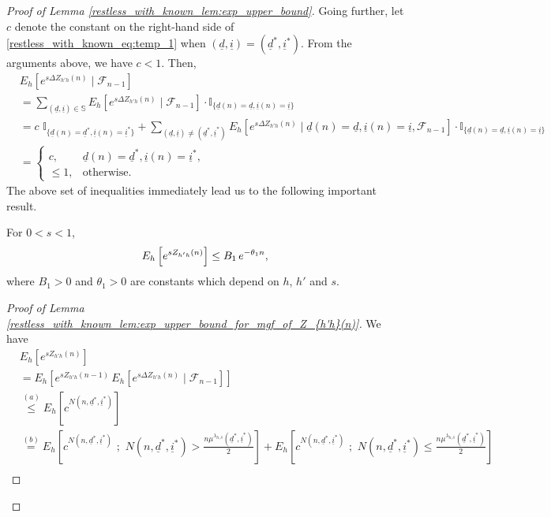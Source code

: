 \begin{proof}[Proof of Lemma \ref{restless_with_known_lem:exp_upper_bound}]
Going further, let $c$ denote the constant on the right-hand side of \eqref{restless_with_known_eq:temp_1} when $(\underline{d},\underline{i})=(\underline{d}^*,\underline{i}^*)$. From the arguments above, we have $c<1$. Then,
\begin{align}
	&E_h\left[e^{s\Delta Z_{h'h}(n)} \mid \mathcal{F}_{n-1}\right]\nonumber\\
	&=\sum\limits_{(\underline{d},\underline{i})\in\mathbb{S}}E_h\left[e^{s\Delta Z_{h'h}(n)} \mid \mathcal{F}_{n-1}\right]\cdot \mathbb{I}_{\{\underline{d}(n)=\underline{d},\underline{i}(n)=\underline{i}\}}\nonumber\\
	&=c\,\,\mathbb{I}_{\{\underline{d}(n)=\underline{d}^*,\underline{i}(n)=\underline{i}^*\}}+\sum\limits_{(\underline{d},\underline{i})\neq (\underline{d}^*,\underline{i}^*)}E_h\left[e^{s\Delta Z_{h'h}(n)} \mid \underline{d}(n)=\underline{d},\underline{i}(n)=\underline{i},\mathcal{F}_{n-1}\right]\cdot \mathbb{I}_{\{\underline{d}(n)=\underline{d},\underline{i}(n)=\underline{i}\}}\nonumber\\
	&=\begin{cases}
		c,&\underline{d}(n)=\underline{d}^*,\underline{i}(n)=\underline{i}^*,\\
		\leq 1,&\text{otherwise}.
	\end{cases}\label{restless_with_known_eq:temp_3}
\end{align}
The above set of inequalities immediately lead us to the following important result.
\begin{lemma}\label{restless_with_known_lem:exp_upper_bound_for_mgf_of_Z_{h'h}(n)}
	For $0<s<1$, 
	\begin{equation}
		E_h\left[e^{s Z_{h'h}(n)}\right]\leq B_1\,e^{-\theta_1 n},\label{restless_with_known_eq:exp_upper_bound_for_mgf_of_Z_{h'h}(n)}
	\end{equation}
	where $B_1>0$  and $\theta_1>0$ are constants which depend on $h$, $h'$ and $s$.
\end{lemma}
\begin{proof}[Proof of Lemma \ref{restless_with_known_lem:exp_upper_bound_for_mgf_of_Z_{h'h}(n)}]
We have
\begin{align}
	&E_h\left[e^{s Z_{h'h}(n)}\right]\nonumber\\
	&=E_h[e^{s Z_{h'h}(n-1)}\,E_h[e^{s \Delta Z_{h'h}(n)}\mid \mathcal{F}_{n-1}]]\nonumber\\
	&\stackrel{(a)}{\leq}E_h\left[c^{N(n,\underline{d}^*,\underline{i}^*)}\right]\nonumber\\
	&\stackrel{(b)}{=}E_h\left[c^{N(n,\underline{d}^*,\underline{i}^*)}\,\,;\,\,N(n,\underline{d}^*,\underline{i}^*)>\frac{n\mu^{\lambda_{h,\delta}}(\underline{d}^*,\underline{i}^*)}{2}\right]+E_h\left[c^{N(n,\underline{d}^*,\underline{i}^*)}\,\,;\,\,N(n,\underline{d}^*,\underline{i}^*)\leq\frac{n\mu^{\lambda_{h,\delta}}(\underline{d}^*,\underline{i}^*)}{2}\right]\nonumber\\

\end{align}
\end{proof}
\end{proof}
